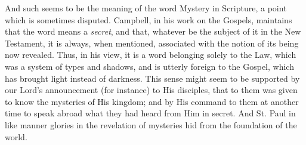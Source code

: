 And such seems to be the meaning of the word
Mystery in Scripture, a point which is sometimes disputed. Campbell,
in his work on the Gospels, maintains that the word means a \emph{secret},
and that, whatever be the subject of it in the New Testament, it is
always, when mentioned, associated with the notion of its being now
revealed. Thus, in his view, it is a word belonging solely to the Law,
which was a system of types and shadows, and is utterly foreign to the
Gospel, which has brought light instead of darkness. This sense might
seem to be supported by our Lord's announcement (for instance) to His
disciples, that to them was given to know the mysteries of His
kingdom; and by His command to them at another time to speak abroad
what they had heard from Him in secret. And St. Paul in like manner
glories in the revelation of mysteries hid from the foundation of the
world.


